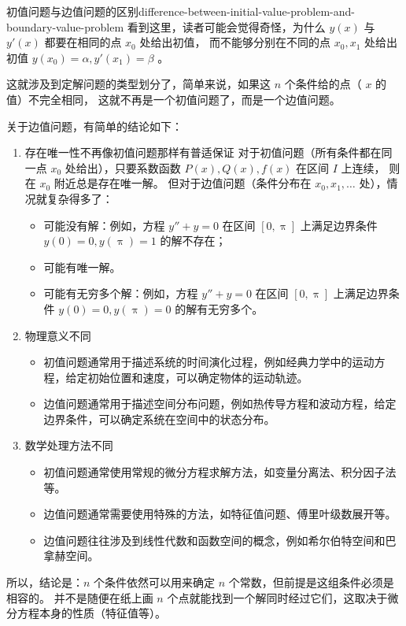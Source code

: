 \begin{note}{初值问题与边值问题的区别}{difference-between-initial-value-problem-and-boundary-value-problem}
    看到这里，读者可能会觉得奇怪，为什么 $ y(x) $ 与 $ y'(x) $ 都要在相同的点 $ x_0 $ 处给出初值，
    而不能够分别在不同的点 $ x_0 , x_1 $ 处给出初值 $ y(x_0) = \alpha , y'(x_1) = \beta $ 。

    这就涉及到定解问题的类型划分了，简单来说，如果这 $ n $ 个条件给的点（ $ x $ 的值）不完全相同，
    这就不再是一个初值问题了，而是一个边值问题。

    关于边值问题，有简单的结论如下：
    \begin{enumerate}
        \item 存在唯一性不再像初值问题那样有普适保证
              对于初值问题（所有条件都在同一点 $ x_0 $ 处给出），只要系数函数 $ P(x) , Q(x) , f(x) $ 在区间 $ I $ 上连续，
              则在 $ x_0 $ 附近总是存在唯一解。
              但对于边值问题（条件分布在 $ x_0 , x_1 , \ldots $ 处），情况就复杂得多了：
              \begin{itemize}
                  \item 可能没有解：例如，方程 $ y'' + y = 0 $ 在区间 $ [0, \uppi] $ 上满足边界条件 $ y(0) = 0 , y(\uppi) = 1 $ 的解不存在；
                  \item 可能有唯一解。
                  \item 可能有无穷多个解：例如，方程 $ y'' + y = 0 $ 在区间 $ [0, \uppi] $ 上满足边界条件 $ y(0) = 0 , y(\uppi) = 0 $ 的解有无穷多个。
              \end{itemize}
        \item 物理意义不同
              \begin{itemize}
                  \item 初值问题通常用于描述系统的时间演化过程，例如经典力学中的运动方程，给定初始位置和速度，可以确定物体的运动轨迹。
                  \item 边值问题通常用于描述空间分布问题，例如热传导方程和波动方程，给定边界条件，可以确定系统在空间中的状态分布。
              \end{itemize}
        \item 数学处理方法不同
              \begin{itemize}
                  \item 初值问题通常使用常规的微分方程求解方法，如变量分离法、积分因子法等。
                  \item 边值问题通常需要使用特殊的方法，如特征值问题、傅里叶级数展开等。
                  \item 边值问题往往涉及到线性代数和函数空间的概念，例如希尔伯特空间和巴拿赫空间。
              \end{itemize}
    \end{enumerate}
    所以，结论是：$ n $ 个条件依然可以用来确定 $ n $ 个常数，但前提是这组条件必须是相容的。
    并不是随便在纸上画 $ n $ 个点就能找到一个解同时经过它们，这取决于微分方程本身的性质（特征值等）。
\end{note}

